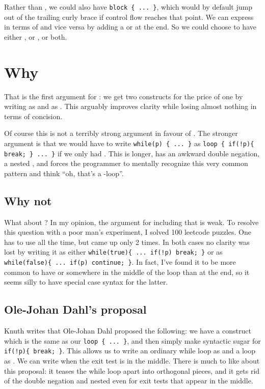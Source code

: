 Rather than , we could also have \lstinline|block { ... }|, which would by default jump out of the trailing curly brace if control flow reaches that point. We can express  in terms of  and vice versa by adding a  or  at the end.
So we could choose to have either , or , or both.

\section{Why }

That is the first argument for : we get two constructs for the price of one by writing  as  and  as . This arguably improves clarity while losing almost nothing in terms of concision.

Of course this is not a terribly strong argument in favour of .
The stronger argument is that we would have to write \lstinline|while(p) { ... }| as \lstinline|loop { if(!p){ break; } ... }| if we only had . This is longer, has an awkward double negation, a nested , and forces the programmer to mentally recognize this very common pattern and think ``oh, that's a -loop''.

\subsection{Why not }

What about ? In my opinion, the argument for including that is weak. To resolve this question with a poor man's experiment, I solved 100 leetcode puzzles. One has to use  all the time, but  came up only 2 times. In both cases no clarity was lost by writing it as either \lstinline|while(true){ ... if(!p) break; }| or as \lstinline|while(false){ ... if(p) continue; }|. In fact, I've found it to be more common to have  or  somewhere in the middle of the loop than at the end, so it seems silly to have special case syntax for the latter.

\subsection{Ole-Johan Dahl's proposal}

Knuth writes that Ole-Johan Dahl proposed the following: we have a  construct which is the same as our \lstinline|loop { ... }|, and then simply make  syntactic sugar for \lstinline|if(!p){ break; }|.
This allows us to write an ordinary while loop as  and a  loop as . We can write  when the exit test is in the middle.
There is much to like about this proposal: it teases the while loop apart into orthogonal pieces, and it gets rid of the double negation and nested  even for exit tests that appear in the middle.

